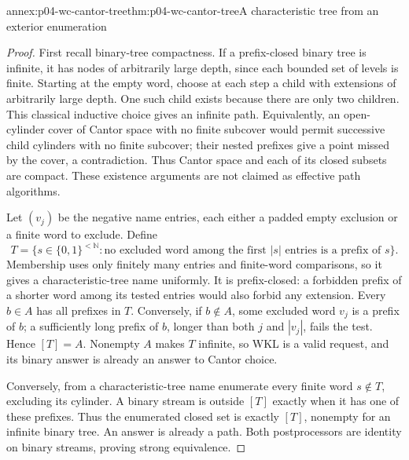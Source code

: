 \begin{annexitem}{annex:p04-wc-cantor-tree}{thm:p04-wc-cantor-tree}{A characteristic tree from an exterior enumeration}
\begin{proof}
First recall binary-tree compactness. If a prefix-closed binary tree
is infinite, it has nodes of arbitrarily large depth, since each
bounded set of levels is finite. Starting at the empty word, choose
at each step a child with extensions of arbitrarily large depth.
One such child exists because there are only two children. This
classical inductive choice gives an infinite path. Equivalently,
an open-cylinder cover of Cantor space with no finite subcover would
permit successive child cylinders with no finite subcover; their nested
prefixes give a point missed by the cover, a contradiction. Thus
Cantor space and each of its closed subsets are compact. These
existence arguments are not claimed as effective path algorithms.

Let \((v_j)\) be the negative name entries, each either a padded
empty exclusion or a finite word to exclude. Define
\[
 T=\{s\in\{0,1\}^{<\mathbb N}:
       \text{no excluded word among the first }|s|
       \text{ entries is a prefix of }s\}.
\]
Membership uses only finitely many entries and finite-word comparisons,
so it gives a characteristic-tree name uniformly. It is prefix-closed:
a forbidden prefix of a shorter word among its tested entries would
also forbid any extension. Every \(b\in A\) has all prefixes in
\(T\). Conversely, if \(b\notin A\), some excluded word \(v_j\)
is a prefix of \(b\); a sufficiently long prefix of \(b\), longer
than both \(j\) and \(|v_j|\), fails the test. Hence \([T]=A\).
Nonempty \(A\) makes \(T\) infinite, so WKL is a valid request,
and its binary answer is already an answer to Cantor choice.

Conversely, from a characteristic-tree name enumerate every finite
word \(s\notin T\), excluding its cylinder. A binary stream is
outside \([T]\) exactly when it has one of these prefixes.
Thus the enumerated closed set is exactly \([T]\), nonempty for an
infinite binary tree. An answer is already a path. Both postprocessors
are identity on binary streams, proving strong equivalence.
\end{proof}
\end{annexitem}

